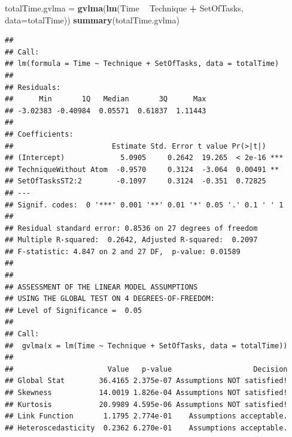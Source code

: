 \documentclass[]{article}
\newenvironment{Shaded}{\begin{snugshade}}{\end{snugshade}}
\newcommand{\DataTypeTok}[1]{\textcolor[rgb]{0.13,0.29,0.53}{#1}}
\newcommand{\KeywordTok}[1]{\textcolor[rgb]{0.13,0.29,0.53}{\textbf{#1}}}
\newcommand{\NormalTok}[1]{#1}
\newcommand{\OperatorTok}[1]{\textcolor[rgb]{0.81,0.36,0.00}{\textbf{#1}}}
\newcommand{\StringTok}[1]{\textcolor[rgb]{0.31,0.60,0.02}{#1}}
\begin{document}
\begin{Shaded}
\end{Shaded}

\begin{Shaded}
\begin{Highlighting}[]
\NormalTok{totalTime.gvlma =}\StringTok{ }\KeywordTok{gvlma}\NormalTok{(}\KeywordTok{lm}\NormalTok{(Time }\OperatorTok{~}\StringTok{ }\NormalTok{Technique }\OperatorTok{+}\StringTok{ }\NormalTok{SetOfTasks, }\DataTypeTok{data=}\NormalTok{totalTime))}
\KeywordTok{summary}\NormalTok{(totalTime.gvlma)}
\end{Highlighting}
\end{Shaded}

\begin{verbatim}
## 
## Call:
## lm(formula = Time ~ Technique + SetOfTasks, data = totalTime)
## 
## Residuals:
##      Min       1Q   Median       3Q      Max 
## -3.02383 -0.40984  0.05571  0.61837  1.11443 
## 
## Coefficients:
##                       Estimate Std. Error t value Pr(>|t|)    
## (Intercept)             5.0905     0.2642  19.265  < 2e-16 ***
## TechniqueWithout Atom  -0.9570     0.3124  -3.064  0.00491 ** 
## SetOfTasksST2:2        -0.1097     0.3124  -0.351  0.72825    
## ---
## Signif. codes:  0 '***' 0.001 '**' 0.01 '*' 0.05 '.' 0.1 ' ' 1
## 
## Residual standard error: 0.8536 on 27 degrees of freedom
## Multiple R-squared:  0.2642, Adjusted R-squared:  0.2097 
## F-statistic: 4.847 on 2 and 27 DF,  p-value: 0.01589
## 
## 
## ASSESSMENT OF THE LINEAR MODEL ASSUMPTIONS
## USING THE GLOBAL TEST ON 4 DEGREES-OF-FREEDOM:
## Level of Significance =  0.05 
## 
## Call:
##  gvlma(x = lm(Time ~ Technique + SetOfTasks, data = totalTime)) 
## 
##                      Value   p-value                   Decision
## Global Stat        36.4165 2.375e-07 Assumptions NOT satisfied!
## Skewness           14.0019 1.826e-04 Assumptions NOT satisfied!
## Kurtosis           20.9989 4.595e-06 Assumptions NOT satisfied!
## Link Function       1.1795 2.774e-01    Assumptions acceptable.
## Heteroscedasticity  0.2362 6.270e-01    Assumptions acceptable.
\end{verbatim}
\end{document}
